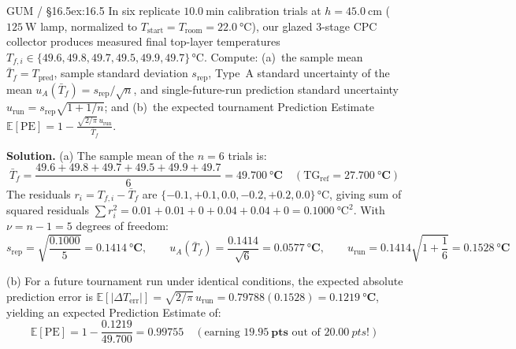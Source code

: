 \begin{workedexample}{GUM / §16.5}{ex:16.5}
In six replicate $\SI{10.0}{\minute}$ calibration trials at $h = \SI{45.0}{\centi\meter}$ ($\SI{125}{\watt}$ lamp, normalized to $T_{\mathrm{start}} = T_{\mathrm{room}} = \SI{22.0}{\celsius}$), our glazed 3-stage CPC collector produces measured final top-layer temperatures $T_{f,i} \in \{49.6, 49.8, 49.7, 49.5, 49.9, 49.7\}\,\si{\celsius}$. Compute: (a)~the sample mean $\bar{T}_f = T_{\mathrm{pred}}$, sample standard deviation $s_{\mathrm{rep}}$, Type~A standard uncertainty of the mean $u_A(\bar{T}_f) = s_{\mathrm{rep}}/\sqrt{n}$, and single-future-run prediction standard uncertainty $u_{\mathrm{run}} = s_{\mathrm{rep}}\sqrt{1 + 1/n}$; and (b)~the expected tournament Prediction Estimate $\mathbb{E}[\mathrm{PE}] = 1 - \frac{\sqrt{2/\pi}\,u_{\mathrm{run}}}{\bar{T}_f}$.

\textbf{Solution.}
(a) The sample mean of the $n = 6$ trials is:
\[
  \bar{T}_f = \frac{49.6 + 49.8 + 49.7 + 49.5 + 49.9 + 49.7}{6} = \mathbf{\SI{49.700}{\celsius}} \quad (\mathrm{TG}_{\mathrm{ref}} = \mathbf{\SI{27.700}{\celsius}})
\]
The residuals $r_i = T_{f,i} - \bar{T}_f$ are $\{-0.1, +0.1, 0.0, -0.2, +0.2, 0.0\}\,\si{\celsius}$, giving sum of squared residuals $\sum r_i^2 = 0.01 + 0.01 + 0 + 0.04 + 0.04 + 0 = \SI{0.1000}{\celsius\squared}$. With $\nu = n - 1 = 5$ degrees of freedom:
\[
  s_{\mathrm{rep}} = \sqrt{\frac{0.1000}{5}} = \mathbf{\SI{0.1414}{\celsius}}, \qquad
  u_A(\bar{T}_f) = \frac{0.1414}{\sqrt{6}} = \mathbf{\SI{0.0577}{\celsius}}, \qquad
  u_{\mathrm{run}} = 0.1414\sqrt{1 + \frac{1}{6}} = \mathbf{\SI{0.1528}{\celsius}}
\]

(b) For a future tournament run under identical conditions, the expected absolute prediction error is $\mathbb{E}[|\Delta T_{\mathrm{err}}|] = \sqrt{2/\pi}\,u_{\mathrm{run}} = 0.79788(0.1528) = \mathbf{\SI{0.1219}{\celsius}}$, yielding an expected Prediction Estimate of:
\[
  \mathbb{E}[\mathrm{PE}] = 1 - \frac{0.1219}{49.700} = \mathbf{0.99755} \quad (\text{earning }\mathbf{\SI{19.95}{pts}}\text{ out of }\SI{20.00}{pts}!)
\]
\end{workedexample}

